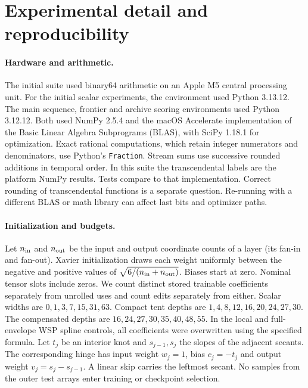 \section{Experimental detail and reproducibility}
\label{app:exp}
\paragraph{Hardware and arithmetic.} The initial suite used binary64 arithmetic on an Apple M5 central processing unit. For the initial scalar experiments, the environment used Python 3.13.12. The main sequence, frontier and archive scoring environments used Python 3.12.12. Both used NumPy 2.5.4 and the macOS Accelerate implementation of the Basic Linear Algebra Subprograms (BLAS), with SciPy 1.18.1 for optimization. Exact rational computations, which retain integer numerators and denominators, use Python's \texttt{Fraction}. Stream sums use successive rounded additions in temporal order. In this suite the transcendental labels are the platform NumPy results. Tests compare to that implementation. Correct rounding of transcendental functions is a separate question. Re-running with a different BLAS or math library can affect last bits and optimizer paths.

\paragraph{Initialization and budgets.} Let \(n_{\rm in}\) and \(n_{\rm out}\) be the input and output coordinate counts of a layer (its fan-in and fan-out). Xavier initialization draws each weight uniformly between the negative and positive values of \(\sqrt{6/(n_{\rm in}+n_{\rm out})}\). Biases start at zero. Nominal tensor slots include zeros. We count distinct stored trainable coefficients separately from unrolled uses and count edits separately from either. Scalar widths are \(0,1,3,7,15,31,63\). Compact tent depths are \(1,4,8,12,16,20,24,27,30\). The compensated depths are \(16,24,27,30,35,40,48,55\). In the local and full-envelope WSP spline controls, all coefficients were overwritten using the specified formula. Let \(t_j\) be an interior knot and \(s_{j-1},s_j\) the slopes of the adjacent secants. The corresponding hinge has input weight \(w_j=1\), bias \(c_j=-t_j\) and output weight \(v_j=s_j-s_{j-1}\). A linear skip carries the leftmost secant. No samples from the outer test arrays enter training or checkpoint selection.

